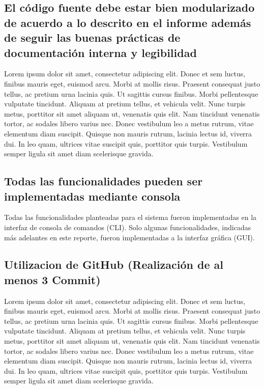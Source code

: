 \clearpage

\subsection{El código fuente debe estar bien modularizado de acuerdo a lo descrito en el informe además de seguir las buenas prácticas de documentación interna y legibilidad}

Lorem ipsum dolor sit amet, consectetur adipiscing elit. Donec et sem luctus, finibus mauris eget, euismod arcu. Morbi at mollis risus. Praesent consequat justo tellus, ac pretium urna lacinia quis. Ut sagittis cursus finibus. Morbi pellentesque vulputate tincidunt. Aliquam at pretium tellus, et vehicula velit. Nunc turpis metus, porttitor sit amet aliquam ut, venenatis quis elit. Nam tincidunt venenatis tortor, ac sodales libero varius nec. Donec vestibulum leo a metus rutrum, vitae elementum diam suscipit. Quisque non mauris rutrum, lacinia lectus id, viverra dui. In leo quam, ultrices vitae suscipit quis, porttitor quis turpis. Vestibulum semper ligula sit amet diam scelerisque gravida.

\subsection{Todas las funcionalidades pueden ser implementadas mediante consola}

Todas las funcionalidades planteadas para el sistema fueron implementadas en la interfaz de consola de comandos (CLI). Solo algunas funcionalidades, indicadas más adelantes en este reporte, fueron implementadas a la interfaz gráfica (GUI).

\subsection{Utilizacion de GitHub (Realización de al menos 3 Commit)}

Lorem ipsum dolor sit amet, consectetur adipiscing elit. Donec et sem luctus, finibus mauris eget, euismod arcu. Morbi at mollis risus. Praesent consequat justo tellus, ac pretium urna lacinia quis. Ut sagittis cursus finibus. Morbi pellentesque vulputate tincidunt. Aliquam at pretium tellus, et vehicula velit. Nunc turpis metus, porttitor sit amet aliquam ut, venenatis quis elit. Nam tincidunt venenatis tortor, ac sodales libero varius nec. Donec vestibulum leo a metus rutrum, vitae elementum diam suscipit. Quisque non mauris rutrum, lacinia lectus id, viverra dui. In leo quam, ultrices vitae suscipit quis, porttitor quis turpis. Vestibulum semper ligula sit amet diam scelerisque gravida.
